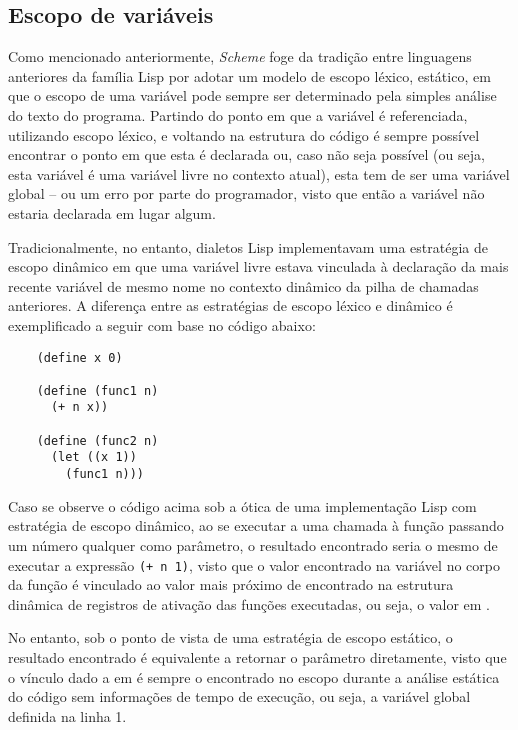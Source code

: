 \subsection{Escopo de variáveis}

Como mencionado anteriormente, \textit{Scheme} foge da tradição entre
linguagens anteriores da família Lisp por adotar um modelo de escopo léxico,
estático, em que o escopo de uma variável pode sempre ser determinado pela
simples análise do texto do programa. Partindo do ponto em que a variável é
referenciada, utilizando escopo léxico, e voltando na estrutura do código é
sempre possível encontrar o ponto em que esta é declarada ou, caso não seja
possível (ou seja, esta variável é uma variável livre no contexto atual), esta
tem de ser uma variável global -- ou um erro por parte do programador, visto
que então a variável não estaria declarada em lugar algum.

Tradicionalmente, no entanto, dialetos Lisp implementavam uma estratégia de
escopo dinâmico em que uma variável livre estava vinculada à declaração da mais
recente variável de mesmo nome no contexto dinâmico da pilha de chamadas
anteriores. A diferença entre as estratégias de escopo léxico e dinâmico é 
exemplificado a seguir com base no código abaixo:

\begin{lstlisting}
    (define x 0)
    
    (define (func1 n) 
      (+ n x))
    
    (define (func2 n) 
      (let ((x 1))
        (func1 n)))
\end{lstlisting}

Caso se observe o código acima sob a ótica de uma implementação Lisp com
estratégia de escopo dinâmico, ao se executar a uma chamada à função
 passando um número qualquer  como parâmetro, o resultado
encontrado seria o mesmo de executar a expressão \texttt{(+ n 1)}, visto que o
valor encontrado na variável  no corpo da função  é
vinculado ao valor mais próximo de  encontrado na estrutura dinâmica de
registros de ativação das funções executadas, ou seja, o valor em .

No entanto, sob o ponto de vista de uma estratégia de escopo estático, o
resultado encontrado é equivalente a retornar o parâmetro diretamente, visto
que o vínculo dado a  em  é sempre o encontrado no escopo
durante a análise estática do código sem informações de tempo de execução, ou
seja, a variável global definida na linha 1.

